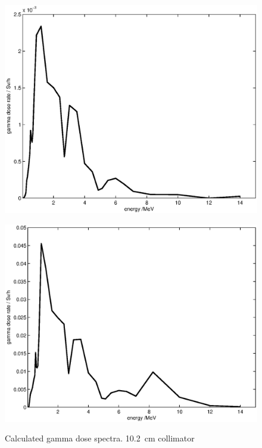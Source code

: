 \documentclass[11pt,a4paper]{IEEEtran}
\let\MYoriglatexcaption\caption
\renewcommand{\caption}[2][\relax]{\MYoriglatexcaption[#2]{#2}}
\begin{document}
\begin{figure}[t]
    \begin{minipage}{\columnwidth}
        \centering
        \includegraphics[width=0.9\columnwidth]{DoseVSenergySUP.eps}
        \label{fig:GammaDoseEnergySUP}
    \end{minipage}
    \begin{minipage}{\columnwidth}
        \centering
        \includegraphics[width=0.9\columnwidth]{DoseVSenergyCUP.eps}
        \label{fig:GammaDoseEnergyCUP}
    \end{minipage}
    \caption{
        Calculated gamma dose spectra.
        \SI{10.2}{\cm} collimator
    }
    \label{fig:GammaDoseEnergy}
\end{figure}
\end{document}
